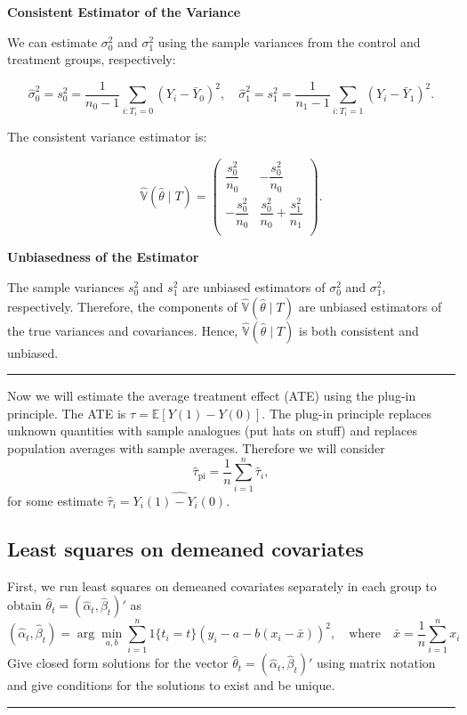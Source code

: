 \documentclass{article}
\newenvironment{colorparagraph}[1]{\par\color{#1}}{\par}
\begin{document}
\textbf{Consistent Estimator of the Variance}

We can estimate \(\sigma_0^2\) and \(\sigma_1^2\) using the sample variances from the control and treatment groups, respectively:

\[
\hat{\sigma}_0^2 = s_0^2 = \dfrac{1}{n_0 - 1} \sum_{i: T_i = 0} (Y_i - \bar{Y}_0)^2, \quad \hat{\sigma}_1^2 = s_1^2 = \dfrac{1}{n_1 - 1} \sum_{i: T_i = 1} (Y_i - \bar{Y}_1)^2.
\]

The consistent variance estimator is:

\[
\hat{\mathbb{V}}(\hat{\theta} \mid T) = \begin{pmatrix}
\dfrac{s_0^2}{n_0} & - \dfrac{s_0^2}{n_0} \\
- \dfrac{s_0^2}{n_0} & \dfrac{s_0^2}{n_0} + \dfrac{s_1^2}{n_1} \\
\end{pmatrix}.
\]

\textbf{Unbiasedness of the Estimator}

The sample variances \(s_0^2\) and \(s_1^2\) are unbiased estimators of \(\sigma_0^2\) and \(\sigma_1^2\), respectively. Therefore, the components of \(\hat{\mathbb{V}}(\hat{\theta} \mid T)\) are unbiased estimators of the true variances and covariances. Hence, \(\hat{\mathbb{V}}(\hat{\theta} \mid T)\) is both consistent and unbiased.

\begin{colorparagraph}{questioncolor}
\rule{\textwidth}{0.5pt}

Now we will estimate the average treatment effect (ATE) using the plug-in principle. The ATE is \(\tau = \mathbb{E}[Y(1) - Y(0)]\). The plug-in principle replaces unknown quantities with sample analogues (put hats on stuff) and replaces population averages with sample averages. Therefore we will consider
\[
\hat{\tau}_{\text{pi}} = \frac{1}{n} \sum_{i=1}^{n} \hat{\tau}_i,
\]
for some estimate \(\hat{\tau}_i = \hat{Y_i(1) - Y_i(0)}\).

\label{q2f}\subsection{Least squares on demeaned covariates}
First, we run least squares on demeaned covariates separately in each group to obtain \(\hat{\theta}_t = (\hat{\alpha}_t, \hat{\beta}_t)'\) as
\[
(\hat{\alpha}_t, \hat{\beta}_t) = \arg\min_{a,b} \sum_{i=1}^{n} 1\{t_i = t\} \left( y_i - a - b(x_i - \bar{x}) \right)^2, \quad \text{where} \quad \bar{x} = \frac{1}{n}\sum_{i=1}^{n} x_i
\]
Give closed form solutions for the vector \(\hat{\theta}_t = (\hat{\alpha}_t, \hat{\beta}_t)'\) using matrix notation and give conditions for the solutions to exist and be unique.

\rule{\textwidth}{0.5pt}
\end{colorparagraph}
\end{document}
